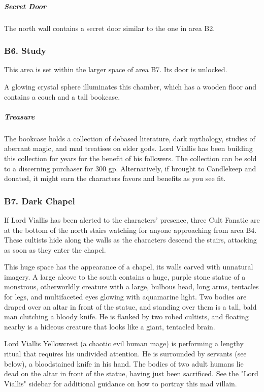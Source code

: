 \documentclass[10pt,a4paper,twoside,bg=print,twocolumn,openany,nodeprecatedcode]{dndbook}
\begin{document}
\subparagraph{Secret Door}
The north wall contains a secret door similar to the one in area B2.

\subsubsection{B6. Study}
This area is set within the larger space of area B7. Its door is unlocked.

\begin{DndReadAloud}{}
A glowing crystal sphere illuminates this chamber, which has a wooden floor and contains a couch and a tall bookcase.

\end{DndReadAloud}

\subparagraph{Treasure}
The bookcase holds a collection of debased literature, dark mythology, studies of aberrant magic, and mad treatises on elder gods. Lord Viallis has been building this collection for years for the benefit of his followers. The collection can be sold to a discerning purchaser for 300 gp. Alternatively, if brought to Candlekeep and donated, it might earn the characters favors and benefits as you see fit.

\subsubsection{B7. Dark Chapel}
If Lord Viallis has been alerted to the characters' presence, three Cult Fanatic are at the bottom of the north stairs watching for anyone approaching from area B4. These cultists hide along the walls as the characters descend the stairs, attacking as soon as they enter the chapel.

\begin{DndReadAloud}{}
This huge space has the appearance of a chapel, its walls carved with unnatural imagery. A large alcove to the south contains a huge, purple stone statue of a monstrous, otherworldly creature with a large, bulbous head, long arms, tentacles for legs, and multifaceted eyes glowing with aquamarine light. Two bodies are draped over an altar in front of the statue, and standing over them is a tall, bald man clutching a bloody knife. He is flanked by two robed cultists, and floating nearby is a hideous creature that looks like a giant, tentacled brain.

\end{DndReadAloud}

Lord Viallis Yellowcrest (a chaotic evil human mage) is performing a lengthy ritual that requires his undivided attention. He is surrounded by servants (see below), a bloodstained knife in his hand. The bodies of two adult humans lie dead on the altar in front of the statue, having just been sacrificed. See the "Lord Viallis" sidebar for additional guidance on how to portray this mad villain.
\end{document}
